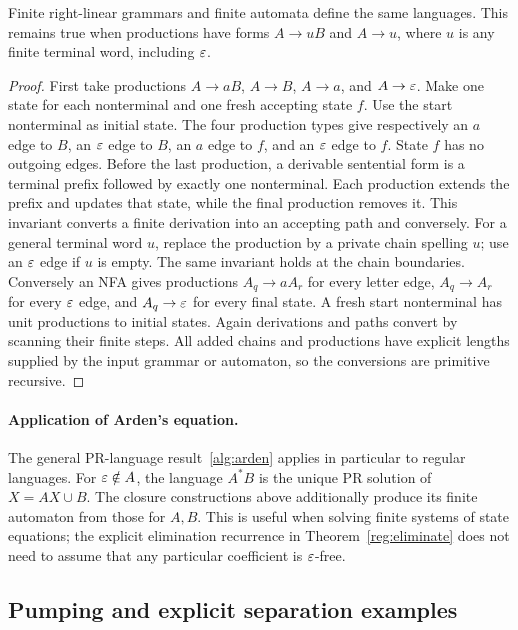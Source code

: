 \begin{theorem}\label{reg:grammar}
Finite right-linear grammars and finite automata define the same languages.
This remains true when productions have forms $A\to uB$ and $A\to u$,
where $u$ is any finite terminal word, including $\varepsilon$.
\end{theorem}
\begin{proof}
First take productions $A\to aB$, $A\to B$, $A\to a$, and
$A\to\varepsilon$.  Make one state for each nonterminal and one fresh accepting
state $f$.  Use the start nonterminal as initial state.  The four
production types give respectively an $a$ edge to $B$, an $\varepsilon$ edge
to $B$, an $a$ edge to $f$, and an $\varepsilon$ edge to $f$.  State $f$ has
no outgoing edges.  Before the last production, a derivable sentential
form is a terminal prefix followed by exactly one nonterminal.  Each
production extends the prefix and updates that state, while the final
production removes it.  This invariant converts a finite derivation
into an accepting path and conversely.
For a general terminal word $u$, replace the production by a private
chain spelling $u$; use an $\varepsilon$ edge if $u$ is empty.  The same invariant
holds at the chain boundaries.
Conversely an NFA gives productions $A_q\to aA_r$ for every letter edge,
$A_q\to A_r$ for every $\varepsilon$ edge, and $A_q\to\varepsilon$ for every final
state.  A fresh start nonterminal has unit productions to initial states.
Again derivations and paths convert by scanning their finite steps.
All added chains and productions have explicit lengths supplied by the
input grammar or automaton, so the conversions are primitive recursive.
\end{proof}

\paragraph{Application of Arden's equation.}
The general PR-language result~\ref{alg:arden} applies in particular to
regular languages.  For $\varepsilon\notin A$, the language $A^*B$ is the unique
PR solution of $X=AX\cup B$.  The closure constructions above additionally
produce its finite automaton from those for $A,B$.  This is useful when
solving finite systems of state equations; the explicit elimination
recurrence in Theorem~\ref{reg:eliminate} does not need to assume that
any particular coefficient is $\varepsilon$-free.

\subsection{Pumping and explicit separation examples}


